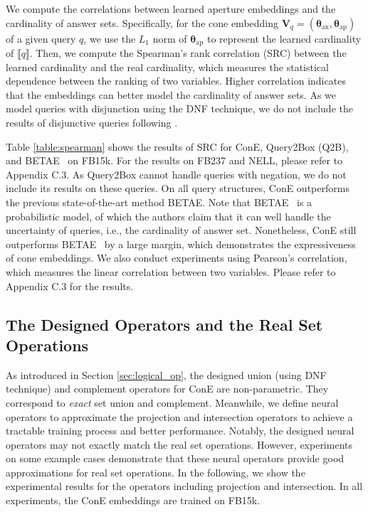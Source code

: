 \documentclass{article}
\newcommand{\gb}[1]{\boldsymbol{#1}}
\newcommand{\taxis}{\text{ax}}
\newcommand{\targ}{\text{ap}}
\newcommand{\betae}{{\normalsize{B}\footnotesize{ETA}\normalsize{E}}}
\begin{document}
We compute the correlations between learned aperture embeddings and the cardinality of answer sets. Specifically, for the cone embedding $\textbf{V}_q=(\gb{\theta}_{\taxis}, \gb{\theta}_{\targ})$ of a given query $q$, we use the $L_1$ norm of $\gb{\theta}_{\targ}$ to represent the learned cardinality of $\llbracket q\rrbracket$. Then, we compute the Spearman's rank correlation (SRC) between the learned cardinality and the real cardinality, which measures the statistical dependence between the ranking of two variables. Higher correlation indicates that the embeddings can better model the cardinality of answer sets. As we model queries with disjunction using the DNF technique, we do not include the results of disjunctive queries following \citet{beta}.

Table \ref{table:spearman} shows the results of SRC for ConE, Query2Box (Q2B), and \betae~ on FB15k. For the results on FB237 and NELL, please refer to Appendix C.3. As Query2Box cannot handle queries with negation, we do not include its results on these queries. On all query structures, ConE outperforms the previous state-of-the-art method \betae. Note that \betae~ is a probabilistic model, of which the authors claim that it can well handle the uncertainty of queries, i.e., the cardinality of answer set. Nonetheless, ConE still outperforms \betae~ by a large margin, which demonstrates the expressiveness of cone embeddings.
We also conduct experiments using Pearson's correlation, which measures the linear correlation between two variables. Please refer to Appendix C.3 for the results.

\subsection{The Designed Operators and the Real Set Operations }
As introduced in Section \ref{sec:logical_op}, the designed union (using DNF technique) and complement operators for ConE are non-parametric. They correspond to \textit{exact} set union and complement. Meanwhile, we define neural operators to approximate the projection and intersection operators to achieve a tractable training process and better performance. Notably, the designed neural operators may not exactly match the real set operations. However, experiments on some example cases demonstrate that these neural operators provide good approximations for real set operations. In the following, we show the experimental results for the operators including projection and intersection. In all experiments, the ConE embeddings are trained on FB15k. 
\end{document}
